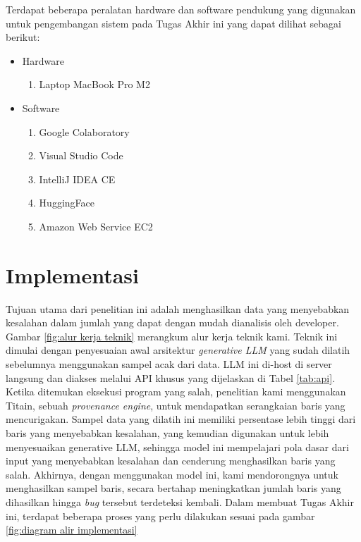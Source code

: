 Terdapat beberapa peralatan hardware dan software pendukung yang digunakan untuk pengembangan sistem pada Tugas Akhir ini yang dapat dilihat sebagai berikut:
\begin{itemize}[topsep=0pt]
  \item Hardware
  \begin{enumerate}[topsep=0pt]
    \item Laptop MacBook Pro M2
  \end{enumerate}
  \item Software
  \begin{enumerate}[topsep=0pt]
    \item Google Colaboratory
    \item Visual Studio Code
    \item IntelliJ IDEA CE
    \item HuggingFace
    \item Amazon Web Service EC2
  \end{enumerate}
\end{itemize}
\section{Implementasi}
\label{sec:implementasi}
Tujuan utama dari penelitian ini adalah menghasilkan data 
yang menyebabkan kesalahan dalam jumlah yang dapat dengan 
mudah dianalisis oleh developer. 
Gambar \ref{fig:alur kerja teknik} merangkum alur 
kerja teknik kami. Teknik ini dimulai 
dengan penyesuaian awal arsitektur \emph{generative LLM} yang 
sudah dilatih sebelumnya menggunakan sampel acak dari data. 
LLM ini di-host di server langsung dan diakses melalui API 
khusus yang dijelaskan di Tabel \ref{tab:api}. Ketika ditemukan eksekusi 
program yang salah, penelitian kami menggunakan Titain, sebuah 
\emph{provenance engine}, untuk mendapatkan serangkaian baris yang 
mencurigakan. Sampel data yang dilatih ini memiliki 
persentase lebih tinggi dari baris yang menyebabkan kesalahan, 
yang kemudian digunakan untuk lebih menyesuaikan generative 
LLM, sehingga model ini mempelajari pola dasar dari input yang 
menyebabkan kesalahan dan cenderung menghasilkan baris 
yang salah. Akhirnya, dengan menggunakan model ini, 
kami mendorongnya untuk menghasilkan 
sampel baris, secara bertahap meningkatkan jumlah baris 
yang dihasilkan hingga \emph{bug} tersebut terdeteksi kembali.
Dalam membuat Tugas Akhir ini, terdapat beberapa proses 
yang perlu dilakukan sesuai pada gambar \ref{fig:diagram alir implementasi}

